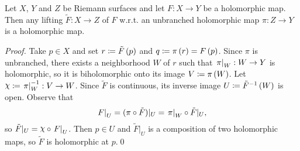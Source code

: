 \documentclass[../Moduli_Spaces_of_Riemann_Surfaces.tex]{subfiles}
\begin{document}
    \begin{proposition}
        Let $X$, $Y$ and $Z$ be Riemann surfaces and let $F:X\to Y$ be a holomorphic map. Then any lifting $\tilde{F}:X\to Z$ of $F$ w.r.t. an unbranched holomorphic map $\pi:Z\to Y$ is a holomorphic map.
    \end{proposition}
    \vspace{-0.1in}
    \begin{proof}
        Take $p\in X$ and set $r\coloneqq\tilde{F}\left(p\right)$ and $q\coloneqq\pi\left(r\right)=F\left(p\right)$. Since $\pi$ is unbranched, there exists a neighborhood $W$ of $r$ such that $\left.\pi\right|_W:W\to Y$ is holomorphic, so it is biholomorphic onto its image $V\coloneqq\pi\left(W\right)$. Let $\cchi\coloneqq\l.\pi\r|_W^{-1}:V\to W $. Since $\tilde{F}$ is continuous, its inverse image $U\coloneqq\tilde{F}^{-1}\left(W\right)$ is open. Observe that
        \begin{equation*}
            \left.F\right|_U=(\pi\circ\tilde{F})|_U=\left.\pi\right|_W\circ\tilde{F}|_U,
        \end{equation*}
        so $\tilde{F}|_U=\cchi\circ\l.F\r|_U$. Then $p\in U$ and $\tilde{F}|_U$ is a composition of two holomorphic maps, so $\tilde{F}$ is holomorphic at $p$.\qed
    \end{proof}
\end{document}
